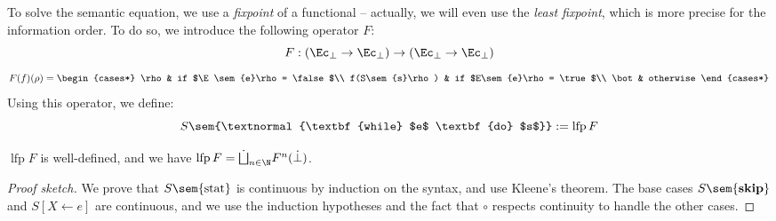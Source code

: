 \documentclass[toc]{../cs-classes/cs-classes}
\DeclareMathOperator{\lfp}{lfp}
\begin{document}
To solve the semantic equation, we use a \emph{fixpoint} of a functional -- actually, we will even use the \emph{least fixpoint}, which is more precise for the information order. To do so, we introduce the following operator $F$:
\begin{equation*}
    F : (\Ec_\bot \to \Ec_\bot) \to (\Ec_\bot\to\Ec_\bot)
\end{equation*}
\begin{equation*}
    F(f)(\rho) = \begin{cases*}
        \rho & if $\E\sem{e}\rho = \false$\\
        f(S\sem{s}\rho) & if $E\sem{e}\rho = \true$\\
        \bot & otherwise
    \end{cases*}
\end{equation*}
Using this operator, we define:
\begin{equation*}
    S\sem{\textnormal{\textbf{while} $e$ \textbf{do} $s$}} := \lfp F
\end{equation*}

\begin{theorem}
    $\lfp F$ is well-defined, and we have $\lfp F=\dot{\bigsqcup}_{n\in\N}F^n(\dot{\bot})$.
\end{theorem}
\begin{proof}[Proof sketch]
    We prove that $S\sem{\textnormal{stat}}$ is continuous by induction on the syntax, and use Kleene's theorem. The base cases $S\sem{\textbf{skip}}$ and $S[X\leftarrow e]$ are continuous, and we use the induction hypotheses and the fact that $\circ$ respects continuity to handle the other cases.
\end{proof}
\end{document}
